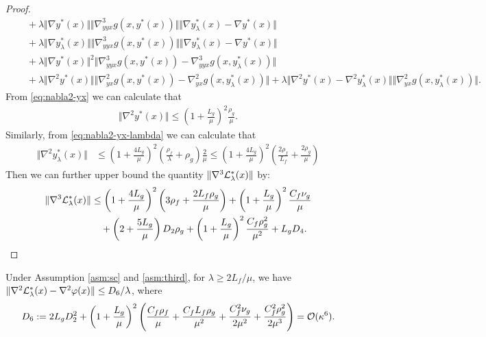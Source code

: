 \begin{proof}
\begin{align*}
    &\quad + \lambda \Vert \nabla y^*(x) \Vert \Vert \nabla_{yyx}^3 g(x,y^*(x)) \Vert  \Vert \nabla y_{\lambda}^*(x) - \nabla y^*(x) \Vert  \\
    &\quad + \lambda \Vert \nabla y_{\lambda}^*(x) \Vert \Vert \nabla_{yyx}^3 g(x,y^*(x)) \Vert  \Vert \nabla y_{\lambda}^*(x) - \nabla y^*(x) \Vert \\
    &\quad + \lambda \Vert \nabla y^*(x) \Vert^2 \Vert \nabla_{yyx}^3 g(x,y^*(x)) - \nabla_{yyx}^3 g(x,y_{\lambda}^*(x)) \Vert \\
    &\quad + \lambda \Vert \nabla^2 y^*(x) \Vert \Vert \nabla_{yx}^2 g(x,y^*(x)) - \nabla_{yx}^2 g(x,y_{\lambda}^*(x)) \Vert + \lambda \Vert \nabla^2 y^*(x) - \nabla^2 y_{\lambda}^*(x) \Vert  \Vert \nabla_{yx}^2 g(x,y_{\lambda}^*(x)) \Vert.
\end{align*}
From \eqref{eq:nabla2-yx} we can calculate that 
\begin{align*}
    \Vert \nabla^2 y^*(x) \Vert \le \left( 1 + \frac{L_g}{\mu} \right)^2 \frac{\rho_g}{\mu}  .
\end{align*}
Similarly, from \eqref{eq:nabla2-yx-lambda} we can calculate that
\begin{align*}
    \Vert \nabla^2 y_{\lambda}^*(x)  \Vert &\le \left( 1 + \frac{4L_g}{\mu} \right)^2 \left( \frac{\rho_f}{\lambda}+ \rho_g \right) \frac{2}{\mu} \le \left( 1 + \frac{4L_g}{\mu} \right)^2 \left( \frac{2\rho_f}{L_f} + \frac{2 \rho_g}{\mu} \right) 
\end{align*}
Then we can further upper bound the quantity $ \Vert \nabla^3 {\mathcal{L}}_{\lambda}^*(x) \Vert$ by:
\begin{align*}
    \Vert \nabla^3 {\mathcal{L}}_{\lambda}^*(x) \Vert & \le \left( 1 + \frac{4L_g}{\mu} \right)^2 \left( 3\rho_f  + \frac{2 L_f \rho_g}{\mu} \right) + \left(1 + \frac{L_g}{\mu} \right)^2 \frac{C_f \nu_g}{\mu} \\
    &\quad + \left(2+ \frac{5L_g}{\mu} \right) D_2 \rho_g +  \left( 1+ \frac{L_g}{\mu} \right)^2 \frac{C_f \rho_g^2}{\mu^2} + L_g D_4.
\end{align*}
\end{proof}
 
\begin{lem} \label{lem:nabla2-phi}
Under Assumption \ref{asm:sc} and \ref{asm:third}, for $\lambda \ge 2 L_f /\mu$, we have $ \Vert \nabla^2 {\mathcal{L}}_{\lambda}^*(x) - \nabla^2 \varphi(x) \Vert \le  D_6 /\lambda$,
where
\begin{align*}
    D_6 := 2L_g D_2^2 + \left( 1 + \frac{L_g}{\mu}\right)^2\left( \frac{C_f \rho_f}{\mu} + \frac{C_f L_f \rho_g}{\mu^2} + \frac{C_f^2 \nu_g}{2 \mu^2} + \frac{C_f^2 \rho_g^2}{2 \mu^3}  \right)  = {\mathcal{O}}(\kappa^6).
\end{align*}
\end{lem}


